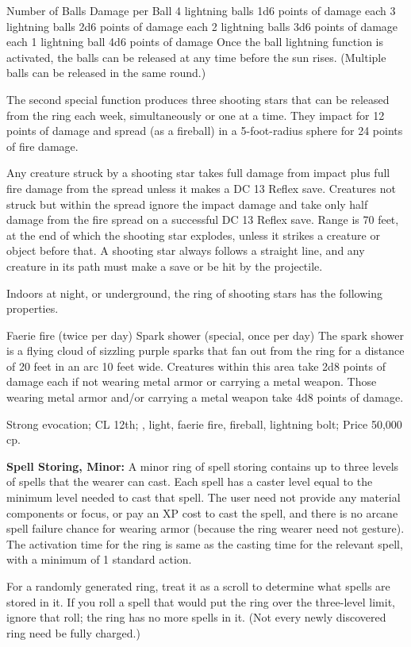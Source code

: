 Number of Balls	Damage per Ball
4 lightning balls	1d6 points of damage each
3 lightning balls	2d6 points of damage each
2 lightning balls	3d6 points of damage each
1 lightning ball	4d6 points of damage
Once the ball lightning function is activated, the balls can be released at any time before the sun rises. (Multiple balls can be released in the same round.)

The second special function produces three shooting stars that can be released from the ring each week, simultaneously or one at a time. They impact for 12 points of damage and spread (as a fireball) in a 5-foot-radius sphere for 24 points of fire damage.

Any creature struck by a shooting star takes full damage from impact plus full fire damage from the spread unless it makes a DC 13 Reflex save. Creatures not struck but within the spread ignore the impact damage and take only half damage from the fire spread on a successful DC 13 Reflex save. Range is 70 feet, at the end of which the shooting star explodes, unless it strikes a creature or object before that. A shooting star always follows a straight line, and any creature in its path must make a save or be hit by the projectile.

Indoors at night, or underground, the ring of shooting stars has the following properties.

Faerie fire (twice per day)
Spark shower (special, once per day)
The spark shower is a flying cloud of sizzling purple sparks that fan out from the ring for a distance of 20 feet in an arc 10 feet wide. Creatures within this area take 2d8 points of damage each if not wearing metal armor or carrying a metal weapon. Those wearing metal armor and/or carrying a metal weapon take 4d8 points of damage.

Strong evocation; CL 12th; , light, faerie fire, fireball, lightning bolt; Price 50,000 cp.

\textbf{Spell Storing, Minor:} A minor ring of spell storing contains up to three levels of spells that the wearer can cast. Each spell has a caster level equal to the minimum level needed to cast that spell. The user need not provide any material components or focus, or pay an XP cost to cast the spell, and there is no arcane spell failure chance for wearing armor (because the ring wearer need not gesture). The activation time for the ring is same as the casting time for the relevant spell, with a minimum of 1 standard action.

For a randomly generated ring, treat it as a scroll to determine what spells are stored in it. If you roll a spell that would put the ring over the three-level limit, ignore that roll; the ring has no more spells in it. (Not every newly discovered ring need be fully charged.)

